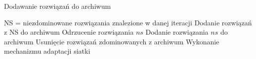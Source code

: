 \begin{algorithm}[H]
\caption{Dodawanie rozwiązań do archiwum}
\begin{algorithmic}
\STATE NS = niezdominowane rozwiązania znalezione w danej iteracji
    \STATE Dodanie rozwiązań z NS do archiwum
\ELSE
            \STATE Odrzucenie rozwiązania $ns$
        \ELSE
            \STATE Dodanie rozwiązania $ns$ do archiwum
                \STATE Usunięcie rozwiązań zdominowanych z archiwum
            \ENDIF
        \ENDIF
    \ENDFOR
\ENDIF
{}
    \STATE Wykonanie mechanizmu adaptacji siatki
\ENDIF
\end{algorithmic}
\end{algorithm}